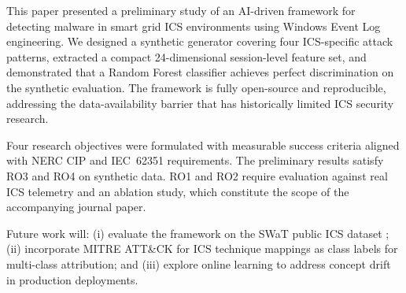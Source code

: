 \label{sec:conc}

This paper presented a preliminary study of an AI-driven framework for detecting malware in
smart grid ICS environments using Windows Event Log engineering. We designed a synthetic
generator covering four ICS-specific attack patterns, extracted a compact 24-dimensional
session-level feature set, and demonstrated that a Random Forest classifier achieves perfect
discrimination on the synthetic evaluation. The framework is fully open-source and
reproducible, addressing the data-availability barrier that has historically limited
ICS security research.

Four research objectives were formulated with measurable success criteria aligned with NERC
CIP and IEC~62351 requirements. The preliminary results satisfy RO3 and RO4 on synthetic
data. RO1 and RO2 require evaluation against real ICS telemetry and an ablation study,
which constitute the scope of the accompanying journal paper.

Future work will: (i) evaluate the framework on the SWaT public ICS dataset
\cite{goh2016swat}; (ii) incorporate MITRE ATT\&CK for ICS technique mappings as class
labels for multi-class attribution; and (iii) explore online learning to address concept
drift in production deployments.
